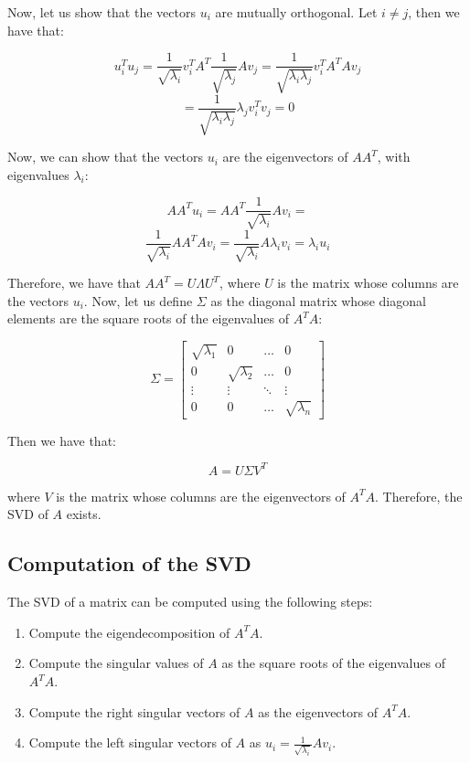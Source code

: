 Now, let us show that the vectors $u_i$ are mutually orthogonal. Let $i \neq j$, then we have that:

$$u_i^T u_j = \frac{1}{\sqrt{\lambda_i}} v_i^T A^T \frac{1}{\sqrt{\lambda_j}} A v_j = \frac{1}{\sqrt{\lambda_i \lambda_j}} v_i^T A^T A v_j$$
$$= \frac{1}{\sqrt{\lambda_i \lambda_j}} \lambda_j v_i^T v_j = 0$$

Now, we can show that the vectors $u_i$ are the eigenvectors of $A A^T$, with eigenvalues
$\lambda_i$:

$$A A^T u_i = A A^T \frac{1}{\sqrt{\lambda_i}} A v_i = $$
$$\frac{1}{\sqrt{\lambda_i}} A A^T A v_i = \frac{1}{\sqrt{\lambda_i}} A \lambda_i v_i = \lambda_i u_i$$

Therefore, we have that $A A^T = U \Lambda U^T$, where $U$ is the matrix whose columns are the vectors $u_i$.
Now, let us define $\Sigma$ as the diagonal matrix whose diagonal elements are the square roots of the eigenvalues of $A^T A$:

$$\Sigma = \begin{bmatrix}
    \sqrt{\lambda_1} & 0 & \ldots & 0 \\
    0 & \sqrt{\lambda_2} & \ldots & 0 \\
    \vdots & \vdots & \ddots & \vdots \\
    0 & 0 & \ldots & \sqrt{\lambda_n}
\end{bmatrix}$$

Then we have that:

$$A = U \Sigma V^T$$

where $V$ is the matrix whose columns are the eigenvectors of $A^T A$. Therefore, the SVD of $A$ exists.

\subsection{Computation of the SVD}

The SVD of a matrix can be computed using the following steps:

\begin{enumerate}
    \item Compute the eigendecomposition of $A^T A$.
    \item Compute the singular values of $A$ as the square roots of the eigenvalues of $A^T A$.
    \item Compute the right singular vectors of $A$ as the eigenvectors of $A^T A$.
    \item Compute the left singular vectors of $A$ as $u_i = \frac{1}{\sqrt{\lambda_i}} A v_i$.
\end{enumerate}

